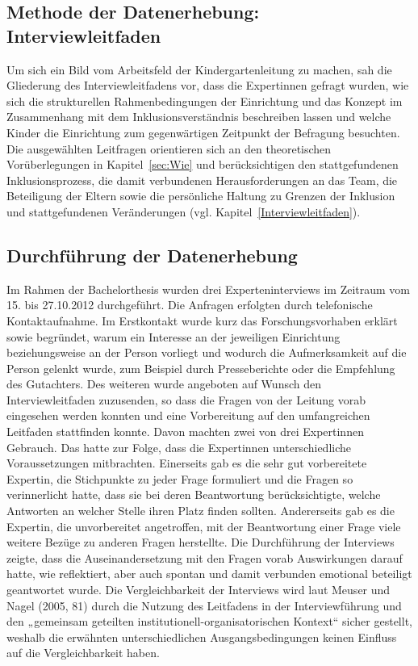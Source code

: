 \subsection{Methode der Datenerhebung: Interviewleitfaden}
Um sich ein Bild vom Arbeitsfeld der Kindergartenleitung zu machen, sah die Gliederung des Interviewleitfadens vor, dass die Expertinnen gefragt wurden, wie sich die strukturellen Rahmenbedingungen der Einrichtung und das Konzept im Zusammenhang mit dem Inklusionsverständnis beschreiben lassen und welche Kinder die Einrichtung zum gegenwärtigen Zeitpunkt der Befragung besuchten. Die ausgewählten Leitfragen orientieren sich an den theoretischen Vorüberlegungen in Kapitel~\ref{sec:Wie} und berücksichtigen den stattgefundenen Inklusionsprozess, die damit verbundenen Herausforderungen an das Team, die Beteiligung der Eltern sowie die persönliche Haltung zu Grenzen der Inklusion und stattgefundenen Veränderungen (vgl. Kapitel~\ref{Interviewleitfaden}).

\subsection{Durchführung der Datenerhebung}
Im Rahmen der Bachelorthesis wurden drei Experteninterviews im Zeitraum vom 15. bis 27.10.2012 durchgeführt. 
Die Anfragen erfolgten durch telefonische Kontaktaufnahme. Im Erstkontakt wurde kurz das Forschungsvorhaben erklärt sowie begründet, warum ein Interesse an der jeweiligen Einrichtung beziehungsweise an der Person vorliegt und wodurch die Aufmerksamkeit auf die Person gelenkt wurde, zum Beispiel durch Presseberichte oder die Empfehlung des Gutachters. 
Des weiteren wurde angeboten auf Wunsch den Interviewleitfaden zuzusenden, so dass die Fragen von der Leitung vorab eingesehen werden konnten und eine Vorbereitung auf den umfangreichen Leitfaden stattfinden konnte. Davon machten zwei von drei Expertinnen Gebrauch. Das hatte zur Folge, dass die Expertinnen unterschiedliche Voraussetzungen mitbrachten. Einerseits gab es die sehr gut vorbereitete Expertin, die Stichpunkte zu jeder Frage formuliert und die Fragen so verinnerlicht hatte, dass sie bei deren Beantwortung berücksichtigte, welche Antworten an welcher Stelle ihren Platz finden sollten. Andererseits gab es die Expertin, die unvorbereitet angetroffen, mit der Beantwortung einer Frage viele weitere Bezüge zu anderen Fragen herstellte. Die Durchführung der Interviews zeigte, dass die Auseinandersetzung mit den Fragen vorab Auswirkungen darauf hatte, wie reflektiert, aber auch spontan und damit verbunden emotional beteiligt geantwortet wurde.     
Die Vergleichbarkeit der Interviews wird laut Meuser und Nagel (2005, 81) durch die Nutzung des Leitfadens in der Interviewführung und den „gemeinsam geteilten institutionell-organisatorischen Kontext“ sicher gestellt, weshalb die erwähnten unterschiedlichen Ausgangsbedingungen keinen Einfluss auf die Vergleichbarkeit haben.


